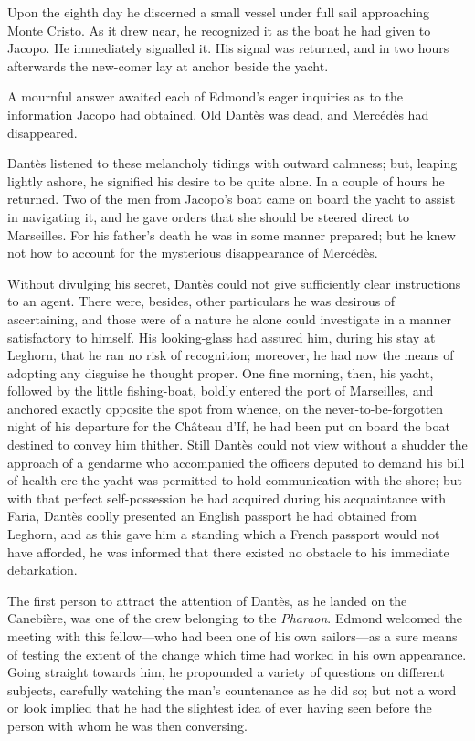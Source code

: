  Upon the eighth day he discerned a small vessel under full sail approaching Monte Cristo. As it drew near, he recognized it as the boat he had given to Jacopo. He immediately signalled it. His signal was returned, and in two hours afterwards the new-comer lay at anchor beside the yacht. 

 A mournful answer awaited each of Edmond's eager inquiries as to the information Jacopo had obtained. Old Dantès was dead, and Mercédès had disappeared. 

 Dantès listened to these melancholy tidings with outward calmness; but, leaping lightly ashore, he signified his desire to be quite alone. In a couple of hours he returned. Two of the men from Jacopo's boat came on board the yacht to assist in navigating it, and he gave orders that she should be steered direct to Marseilles. For his father's death he was in some manner prepared; but he knew not how to account for the mysterious disappearance of Mercédès. 

 Without divulging his secret, Dantès could not give sufficiently clear instructions to an agent. There were, besides, other particulars he was desirous of ascertaining, and those were of a nature he alone could investigate in a manner satisfactory to himself. His looking-glass had assured him, during his stay at Leghorn, that he ran no risk of recognition; moreover, he had now the means of adopting any disguise he thought proper. One fine morning, then, his yacht, followed by the little fishing-boat, boldly entered the port of Marseilles, and anchored exactly opposite the spot from whence, on the never-to-be-forgotten night of his departure for the Château d'If, he had been put on board the boat destined to convey him thither.  Still Dantès could not view without a shudder the approach of a gendarme who accompanied the officers deputed to demand his bill of health ere the yacht was permitted to hold communication with the shore; but with that perfect self-possession he had acquired during his acquaintance with Faria, Dantès coolly presented an English passport he had obtained from Leghorn, and as this gave him a standing which a French passport would not have afforded, he was informed that there existed no obstacle to his immediate debarkation. 

 The first person to attract the attention of Dantès, as he landed on the Canebière, was one of the crew belonging to the \textit{Pharaon}. Edmond welcomed the meeting with this fellow—who had been one of his own sailors—as a sure means of testing the extent of the change which time had worked in his own appearance. Going straight towards him, he propounded a variety of questions on different subjects, carefully watching the man's countenance as he did so; but not a word or look implied that he had the slightest idea of ever having seen before the person with whom he was then conversing. 

